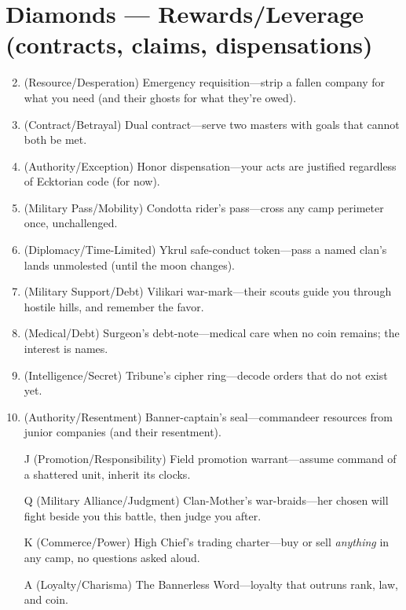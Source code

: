 \section*{Diamonds --- Rewards/Leverage (contracts, claims, dispensations)}
\label{sec:black-banners-rewards}
\begin{enumerate}
\setcounter{enumi}{1}
\item (Resource/Desperation) Emergency requisition---strip a fallen company for what you need (and their ghosts for what they're owed).
\item (Contract/Betrayal) Dual contract---serve two masters with goals that cannot both be met.
\item (Authority/Exception) Honor dispensation---your acts are justified regardless of Ecktorian code (for now).
\item (Military Pass/Mobility) Condotta rider's pass---cross any camp perimeter once, unchallenged.
\item (Diplomacy/Time-Limited) Ykrul safe-conduct token---pass a named clan's lands unmolested (until the moon changes).
\item (Military Support/Debt) Vilikari war-mark---their scouts guide you through hostile hills, and remember the favor.
\item (Medical/Debt) Surgeon's debt-note---medical care when no coin remains; the interest is names.
\item (Intelligence/Secret) Tribune's cipher ring---decode orders that do not exist yet.
\item (Authority/Resentment) Banner-captain's seal---commandeer resources from junior companies (and their resentment).
\item[J] (Promotion/Responsibility) Field promotion warrant---assume command of a shattered unit, inherit its clocks.
\item[Q] (Military Alliance/Judgment) Clan-Mother's war-braids---her chosen will fight beside you this battle, then judge you after.
\item[K] (Commerce/Power) High Chief's trading charter---buy or sell \emph{anything} in any camp, no questions asked aloud.
\item[A] (Loyalty/Charisma) The Bannerless Word---loyalty that outruns rank, law, and coin.
\end{enumerate}

